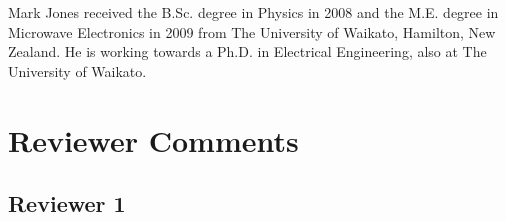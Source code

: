\documentclass[journal, a4paper]{IEEEtran}
\begin{document}
\begin{IEEEbiography}{Mark Jones}
received the B.Sc. degree in Physics in 2008 and the M.E. degree in Microwave Electronics in 2009 from The University of Waikato, Hamilton, New Zealand.
He is working towards a Ph.D. in Electrical Engineering, also at The University of Waikato.
\end{IEEEbiography}

\section*{Reviewer Comments}

\subsection*{Reviewer 1}
\end{document}
